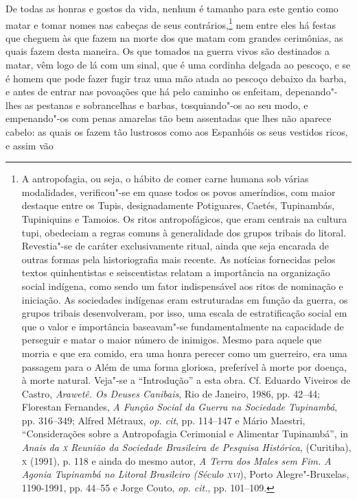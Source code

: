 De todas as honras e gostos da vida, nenhum é tamanho para
este gentio como matar e tomar nomes nas cabeças de seus 
contrários,\footnote{ A antropofagia, ou seja, o hábito de comer carne humana sob
várias modalidades, verificou"-se em quase todos os povos ameríndios,
com maior destaque entre os Tupis, designadamente Potiguares, Caetés,
Tupinambás, Tupiniquins e Tamoios. Os ritos antropofágicos, que eram
centrais na cultura tupi, obedeciam a regras comuns à generalidade dos
grupos tribais do litoral. Revestia"-se de caráter exclusivamente
ritual, ainda que seja encarada de outras formas pela historiografia
mais recente. As notícias fornecidas pelos textos quinhentistas e
seiscentistas relatam a importância na organização social indígena,
como sendo um fator indispensável aos ritos de nominação e iniciação.
As sociedades indígenas eram estruturadas em função da guerra, os
grupos tribais desenvolveram, por isso, uma escala de estratificação
social em que o valor e importância baseavam"-se fundamentalmente na
capacidade de perseguir e matar o maior número de inimigos. Mesmo para
aquele que morria e que era comido, era uma honra perecer como um
guerreiro, era uma passagem para o Além de uma forma gloriosa,
preferível à morte por doença, à morte natural. Veja"-se a ``Introdução''
a esta obra. Cf. Eduardo Viveiros de Castro, \textit{Arawetê. Os
Deuses Canibais}, Rio de Janeiro, 1986, pp. 42--44; Florestan Fernandes,
\textit{A Função Social da Guerra na Sociedade Tupinambá}, pp. 316--349;
Alfred Métraux, \textit{op. cit}, pp. 114--147 e Mário Maestri, ``Considerações 
sobre a Antropofagia Cerimonial e Alimentar Tupinambá'',
in \textit{Anais da \textsc{x} Reunião da Sociedade Brasileira de Pesquisa
Histórica}, (Curitiba), \textsc{x} (1991), p. 118 e ainda do mesmo autor,
\textit{A Terra dos Males sem Fim. A Agonia Tupinambá no Litoral
Brasileiro (Século \textsc{xvi}}), Porto Alegre"-Bruxelas, 1190-1991, pp. 44--55 e
Jorge Couto, \textit{op. cit.}, pp. 101--109.} nem entre eles há festas
que cheguem às que fazem na morte dos que matam com grandes cerimônias,
as quais fazem desta maneira. Os que tomados na guerra vivos são
destinados a matar, vêm logo de lá com um sinal, que é uma cordinha
delgada ao pescoço, e se é homem que pode fazer fugir traz uma mão
atada ao pescoço debaixo da barba, e antes de entrar nas povoações que
há pelo caminho os enfeitam, depenando"-lhes as pestanas e sobrancelhas
e barbas, tosquiando"-os ao seu modo, e empenando"-os com penas amarelas
tão bem assentadas que lhes não aparece cabelo: as quais os fazem tão
lustrosos como aos Espanhóis os seus vestidos ricos, e assim vão
